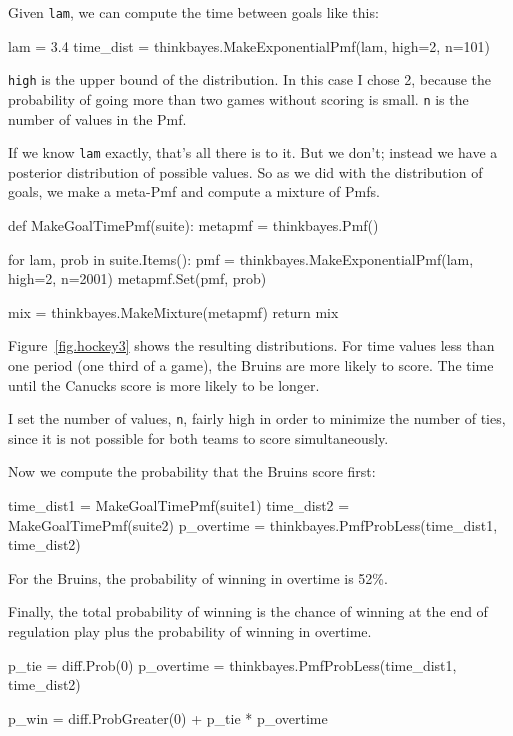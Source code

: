 \documentclass[12pt]{book}
\theoremstyle{exercise}
\begin{document}
Given {\tt lam}, we can compute the time between goals like this: 

\begin{code}
lam = 3.4
time_dist = thinkbayes.MakeExponentialPmf(lam, high=2, n=101)
\end{code}  

{\tt high} is the upper bound of the distribution.  In this case
I chose 2, because the probability of going more than two games
without scoring is small.  {\tt n} is the number of values in
the Pmf.

If we know {\tt lam} exactly, that's all there is to it.
But we don't; instead we have a posterior
distribution of possible values.  So as we did with the distribution
of goals, we make a meta-Pmf and compute a mixture of
Pmfs.

\begin{code}
def MakeGoalTimePmf(suite):
    metapmf = thinkbayes.Pmf()

    for lam, prob in suite.Items():
        pmf = thinkbayes.MakeExponentialPmf(lam, high=2, n=2001)
        metapmf.Set(pmf, prob)

    mix = thinkbayes.MakeMixture(metapmf)
    return mix
\end{code}  

Figure~\ref{fig.hockey3} shows the resulting distributions.  For
time values less than one period (one third of a game), the Bruins
are more likely to score.  The time until the Canucks score is
more likely to be longer.

I set the number of values, {\tt n}, fairly high in order to minimize
the number of ties, since it is not possible for both teams
to score simultaneously.

Now we compute the probability that the Bruins score first:

\begin{code}
    time_dist1 = MakeGoalTimePmf(suite1)
    time_dist2 = MakeGoalTimePmf(suite2)
    p_overtime = thinkbayes.PmfProbLess(time_dist1, time_dist2)
\end{code}  

For the Bruins, the probability of winning in overtime is 52\%.

Finally, the total probability of winning is the chance of
winning at the end of regulation play plus the probability
of winning in overtime.

\begin{code}
    p_tie = diff.Prob(0)
    p_overtime = thinkbayes.PmfProbLess(time_dist1, time_dist2)

    p_win = diff.ProbGreater(0) + p_tie * p_overtime
\end{code}  
\end{document}

